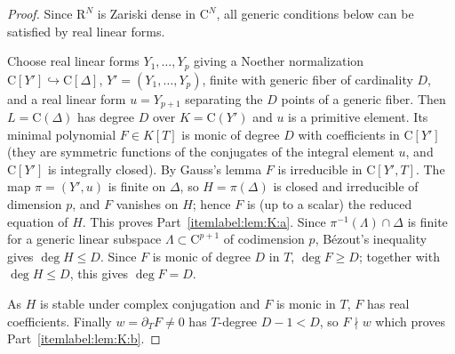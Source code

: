 \documentclass[10pt]{amsart}
\theoremstyle{definition}
\theoremstyle{remark}
\numberwithin{equation}{section}
\newcommand {\R} {\mathrm{R}}
\newcommand {\C}     {\mathrm{C}}
\begin{document}
\begin{proof}
Since $\R^N$ is Zariski dense in $\C^N$, all generic conditions below can be satisfied by real linear forms.

Choose real linear forms $Y_1,\dots,Y_p$ giving a Noether normalization $\C[Y']\hookrightarrow\C[\Delta]$, $Y'=(Y_1,\dots,Y_p)$, finite with generic fiber of cardinality $D$, and a real linear form $u=Y_{p+1}$ separating the $D$ points of a generic fiber. Then $L=\C(\Delta)$ has degree $D$ over $K=\C(Y')$ and $u$ is a primitive element. Its minimal polynomial $F\in K[T]$ is monic of degree $D$ with coefficients in $\C[Y']$ (they are symmetric functions of the conjugates of the integral element $u$, and $\C[Y']$ is integrally closed). By Gauss's lemma $F$ is irreducible in $\C[Y',T]$. The map $\pi=(Y',u)$ is finite on $\Delta$, so $H=\pi(\Delta)$ is closed and irreducible of dimension $p$, and $F$ vanishes on $H$; hence $F$ is (up to a scalar) the reduced equation of $H$. 
This proves Part~\eqref{itemlabel:lem:K:a}.
Since $\pi^{-1}(\Lambda)\cap\Delta$ is finite for 
a generic
linear subspace $\Lambda\subset\C^{p+1}$ of codimension $p$, B\'ezout's inequality gives $\deg H\le D$. 
Since \(F\) is monic of degree \(D\) in \(T\), \(\deg F\ge D\); together with \(\deg H\le D\), this gives \(\deg F=D\).




As $H$ is stable under complex conjugation and $F$ is monic in $T$, $F$ has real coefficients. Finally $w=\partial_TF\ne0$ has $T$-degree $D-1<D$, so $F\nmid w$ 
which proves Part~\eqref{itemlabel:lem:K:b}.


\end{proof}
\end{document}
